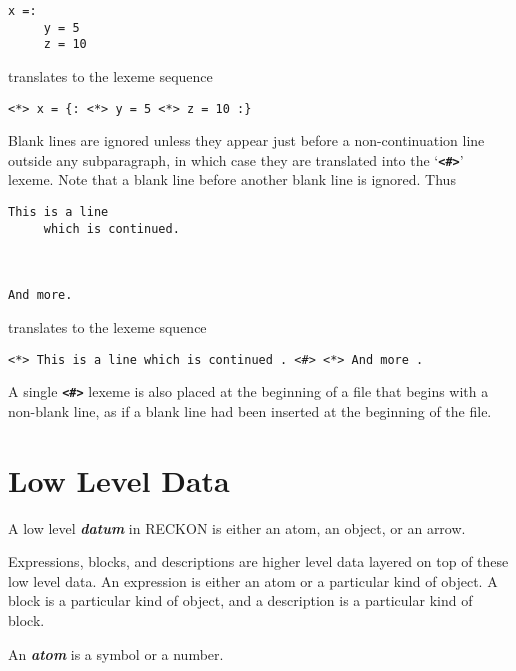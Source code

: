 \documentclass[12pt]{article}
\makeatletter
\newcommand{\TT}[1]{{\tt \bfseries #1}}
\newcommand{\key}[1]{{\bf \em #1}\index{#1}}
\newcommand{\ttkey}[1]{\TT{#1}\index{#1@{\tt #1}}}
\newenvironment{indpar}[1][0.3in]%
	{\begin{list}{}%
		     {\setlength{\itemsep}{0in}%
		      \setlength{\topsep}{0in}%
		      \setlength{\parsep}{1ex}%
		      \setlength{\labelwidth}{#1}%
		      \setlength{\leftmargin}{#1}%
		      \addtolength{\leftmargin}{\labelsep}}%
	 \item}%
	{\end{list}}
\makeatother
\begin{document}
\begin{indpar}\begin{verbatim}
x =:
     y = 5
     z = 10
\end{verbatim}\end{indpar}

translates to the lexeme sequence

\begin{indpar}\begin{verbatim}
<*> x = {: <*> y = 5 <*> z = 10 :}
\end{verbatim}\end{indpar}

Blank lines are ignored unless they appear just before a non-continuation
line outside any subparagraph,
in which case they are translated into the `\ttkey{<\#>}' lexeme.
Note that a blank line before another blank line is ignored.  Thus

\begin{indpar}\begin{verbatim}
This is a line
     which is continued.



And more.
\end{verbatim}\end{indpar}

translates to the lexeme squence

\begin{indpar}\begin{verbatim}
<*> This is a line which is continued . <#> <*> And more .
\end{verbatim}\end{indpar}


A single \TT{<\#>} lexeme is also placed at the beginning of
a file that begins with a non-blank line, as if a blank line 
had been inserted at the beginning of the file.


\section{Low Level Data}

A low level \key{datum} in RECKON is either an atom, an object, or an arrow.

Expressions, blocks, and descriptions are higher level data layered
on top of these low level data.  An expression is either an atom or
a particular kind of object.  A block is a particular kind of object,
and a description is a particular kind of block.

An \key{atom} is a symbol or a number.
\end{document}
